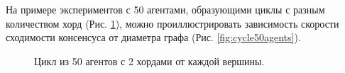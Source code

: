 \documentclass[a4paper,article,14pt]{extarticle}
\begin{document}
На примере экспериментов с 50 агентами, образующими циклы с разным количеством хорд (Рис. \ref{fig:cycle50}), можно проиллюстрировать зависимость скорости сходимости консенсуса от диаметра графа (Рис. \ref{fig:cycle50agents}).

\begin{figure}[H]
\begin{center}
\caption{
\label{fig:cycle50}
    Цикл из 50 агентов с 2 хордами от каждой вершины.}
\end{center}
\end{figure}
\end{document}
